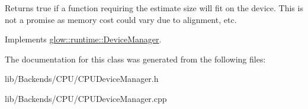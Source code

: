 Returns true if a function requiring the {\ttfamily estimate} size will fit on the device. This is not a promise as memory cost could vary due to alignment, etc. 

Implements \hyperlink{classglow_1_1runtime_1_1_device_manager_ae9bba4abda9cb6aa1359a69e942feb22}{glow\+::runtime\+::\+Device\+Manager}.



The documentation for this class was generated from the following files\+:\begin{DoxyCompactItemize}
\item 
lib/\+Backends/\+C\+P\+U/C\+P\+U\+Device\+Manager.\+h\item 
lib/\+Backends/\+C\+P\+U/C\+P\+U\+Device\+Manager.\+cpp\end{DoxyCompactItemize}
